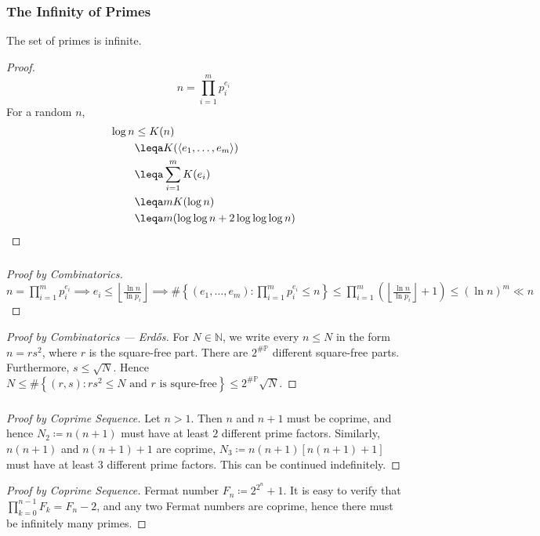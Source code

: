 \documentclass[UTF8,aspectratio=43,11pt,colorlinks,compress,openany]{beamer}%
\begin{document}
\begin{frame}\frametitle{The Infinity of Primes}
\setlength\abovedisplayskip{0pt}
\setlength\belowdisplayskip{0pt}
	\vspace*{-.15\textheight}
	\begin{theorem}
		The set of primes is infinite.
	\end{theorem}
	\vspace*{-.01\textheight}
	\begin{proof}
		\[n=\prod\limits_{i=1}^m p_i^{e_i}\]
		For a random $n$,
		\begin{align*}
		\log n &\leq K(n)\\
		&\leqa K(\langle e_1,\ldots,e_m\rangle)\\
		&\leqa\sum\limits_{i=1}^m K(e_i)\\
		&\leqa mK(\log n)\\
		&\leqa m(\log\log n+2\log\log\log n)
		\end{align*}
	\end{proof}\vspace*{-.49\textwidth}
\end{frame}

\begin{frame}\frametitle{}
\begin{proof}[Proof by Combinatorics]
	$n=\prod\limits_{i=1}^m p_i^{e_i}\implies e_i\leq\left\lfloor\frac{\ln n}{\ln p_i}\right\rfloor\implies\#\left\{(e_1,\dots,e_m): \prod\limits_{i=1}^m p_i^{e_i}\leq n\right\}\leq \prod\limits_{i=1}^m\left(\left\lfloor\frac{\ln n}{\ln p_i}\right\rfloor+1\right)\leq (\ln n)^m\ll n$
\end{proof}
\begin{proof}[Proof by Combinatorics --- Erd\H{o}s]
For $N\in\mathbb{N}$, we write every $n\leq N$ in the form $n=rs^2$, where $r$ is the square-free part. There are $2^{\#\mathbb{P}}$ different square-free parts. Furthermore, $s\leq\sqrt{N}$. Hence $N\leq\#\left\{(r,s): rs^2\leq N \mbox{ and $r$ is squre-free}\right\}\leq 2^{\#\mathbb{P}}\sqrt{N}$.
\end{proof}
\end{frame}

\begin{frame}\frametitle{}
\begin{proof}[Proof by Coprime Sequence]
Let $n>1$. Then $n$ and $n+1$ must be coprime, and hence $N_2\coloneqq n(n + 1)$ must have at least $2$ different prime factors. Similarly, $n(n+1)$ and $n(n+1)+1$ are coprime, $N_3\coloneqq n(n + 1)[n(n + 1) + 1]$ must have at least $3$ different prime factors. This can be continued indefinitely.
\end{proof}
\begin{proof}[Proof by Coprime Sequence]
Fermat number $F_n\coloneqq 2^{2^n}+1$. It is easy to verify that $\prod\limits_{k=0}^{n-1}F_k=F_n-2$, and any two Fermat numbers are coprime, hence there must be infinitely many primes.
\end{proof}
\end{frame}
\end{document}
